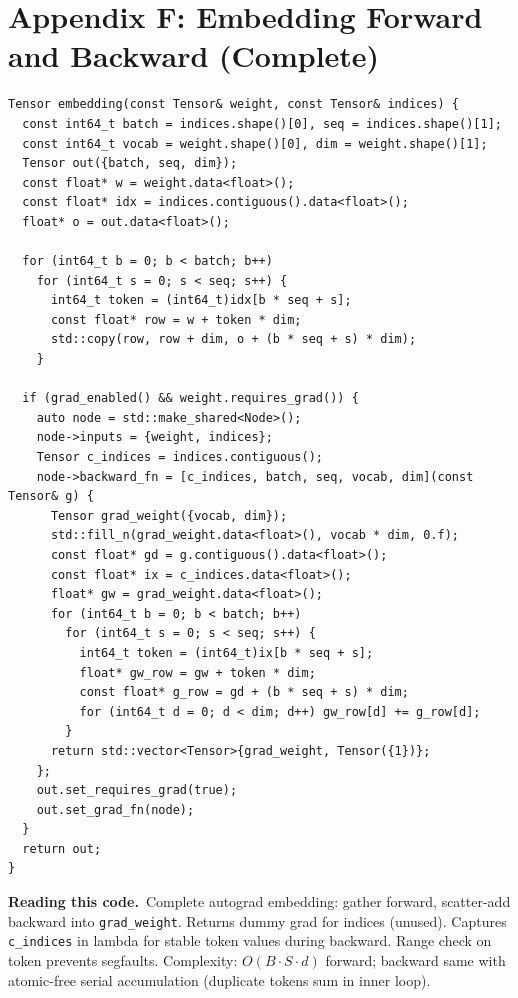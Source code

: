 \documentclass[11pt,a4paper]{article}
\newcommand{\explain}{\par\smallskip\noindent}
\newcommand{\exhead}{\textbf{Reading this code.}\ }
\begin{document}
\section{Appendix F: Embedding Forward and Backward (Complete)}
\label{app:embedding}

\begin{lstlisting}[style=cpp]
Tensor embedding(const Tensor& weight, const Tensor& indices) {
  const int64_t batch = indices.shape()[0], seq = indices.shape()[1];
  const int64_t vocab = weight.shape()[0], dim = weight.shape()[1];
  Tensor out({batch, seq, dim});
  const float* w = weight.data<float>();
  const float* idx = indices.contiguous().data<float>();
  float* o = out.data<float>();

  for (int64_t b = 0; b < batch; b++)
    for (int64_t s = 0; s < seq; s++) {
      int64_t token = (int64_t)idx[b * seq + s];
      const float* row = w + token * dim;
      std::copy(row, row + dim, o + (b * seq + s) * dim);
    }

  if (grad_enabled() && weight.requires_grad()) {
    auto node = std::make_shared<Node>();
    node->inputs = {weight, indices};
    Tensor c_indices = indices.contiguous();
    node->backward_fn = [c_indices, batch, seq, vocab, dim](const Tensor& g) {
      Tensor grad_weight({vocab, dim});
      std::fill_n(grad_weight.data<float>(), vocab * dim, 0.f);
      const float* gd = g.contiguous().data<float>();
      const float* ix = c_indices.data<float>();
      float* gw = grad_weight.data<float>();
      for (int64_t b = 0; b < batch; b++)
        for (int64_t s = 0; s < seq; s++) {
          int64_t token = (int64_t)ix[b * seq + s];
          float* gw_row = gw + token * dim;
          const float* g_row = gd + (b * seq + s) * dim;
          for (int64_t d = 0; d < dim; d++) gw_row[d] += g_row[d];
        }
      return std::vector<Tensor>{grad_weight, Tensor({1})};
    };
    out.set_requires_grad(true);
    out.set_grad_fn(node);
  }
  return out;
}
\end{lstlisting}
\explain\exhead Complete autograd embedding: gather forward, scatter-add backward into
\texttt{grad\_weight}. Returns dummy grad for indices (unused). Captures \texttt{c\_indices} in
lambda for stable token values during backward. Range check on token prevents segfaults.
Complexity: $O(B \cdot S \cdot d)$ forward; backward same with atomic-free serial accumulation
(duplicate tokens sum in inner loop).
\end{document}
